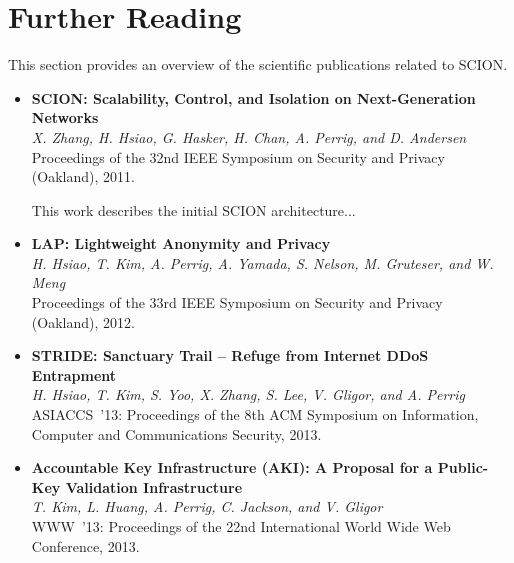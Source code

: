 \section{Further Reading}

This section provides an overview of the scientific publications related to SCION.

\begin{itemize}

\item \textbf{SCION: Scalability, Control, and Isolation on Next-Generation Networks}~\cite{ZHHCPA2011}\\
\textit{X. Zhang, H. Hsiao, G. Hasker, H. Chan, A. Perrig, and D. Andersen} \\
{\footnotesize Proceedings of the 32nd IEEE Symposium on Security and Privacy (Oakland), 2011.}

This work describes the initial SCION architecture...


\item \textbf{LAP: Lightweight Anonymity and Privacy}~\cite{HKPYNGM2012}\\
\textit{H. Hsiao, T. Kim, A. Perrig, A. Yamada, S. Nelson, M. Gruteser, and W. Meng} \\
{\footnotesize Proceedings of the 33rd IEEE Symposium on Security and Privacy (Oakland), 2012.}


\item \textbf{STRIDE: Sanctuary Trail – Refuge from Internet DDoS Entrapment}~\cite{HKYZLGP2013}\\
\textit{H. Hsiao, T. Kim, S. Yoo, X. Zhang, S. Lee, V. Gligor, and A. Perrig} \\
{\footnotesize ASIACCS~'13: Proceedings of the 8th ACM Symposium on Information, Computer and Communications Security, 2013.}


\item \textbf{Accountable Key Infrastructure (AKI): A Proposal for a Public-Key Validation Infrastructure}~\cite{KHPJG2013}\\
\textit{T. Kim, L. Huang, A. Perrig, C. Jackson, and V. Gligor} \\
{\footnotesize WWW~'13: Proceedings of the 22nd International World Wide Web Conference, 2013.}




\end{itemize}



